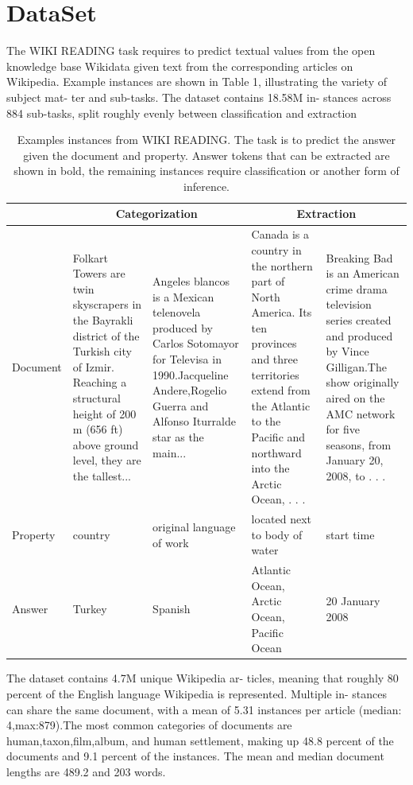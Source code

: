 \documentclass{article}
\begin{document}
\section{DataSet}
\label{data_set}

The WIKI READING task requires to predict textual values from the open knowledge base Wikidata given text from the corresponding articles on
Wikipedia. Example instances are shown
in Table 1, illustrating the variety of subject mat-
ter and sub-tasks. The dataset contains 18.58M in-
stances across 884 sub-tasks, split roughly evenly
between classification and extraction
 
\begin{table}[h!]
\begin{tabular}{ |p{2cm}|p{2cm}|p{2cm}|p{2cm}|p{2cm}|  }
 \hline
 \multicolumn{1}{|c|}{} &
 \multicolumn{2}{|c|}{Categorization} &
 \multicolumn{2}{|c|}{Extraction} \\
 \hline
 Document & Folkart Towers are twin  skyscrapers  in  the Bayrakli  district  of  the Turkish   city   of   Izmir. Reaching    a    structural height of 200 m (656 ft) above ground level, they are the tallest... &Angeles   blancos   is   a Mexican telenovela produced   by   Carlos   Sotomayor  for  Televisa  in
1990.Jacqueline  Andere,Rogelio   Guerra and   Alfonso   Iturralde star as the main... &Canada is a country in  the  northern  part  of North  America.   Its  ten
provinces and three territories  extend  from  the
Atlantic to  the Pacific and  northward  into  the
Arctic Ocean, . . .&Breaking Bad is an American  crime  drama television  series  created and  produced  by  Vince Gilligan.The show originally  aired  on  the
AMC  network  for  five seasons,  from January 20, 2008, to . . .\\
 \hline
 Property   & country    &original language of work&   located  next  to  body  of water& start time\\
 \hline
 Answer &   Turkey  & Spanish &Atlantic  Ocean,   Arctic Ocean, Pacific Ocean& 20 January 2008\\
 \hline
\end{tabular}

\caption{Examples instances from WIKI READING. The task is to predict the answer given the document and property. Answer tokens that can be extracted are shown in bold, the remaining instances require classification or another form of inference.}
\label{table:1}
\end{table}

The  dataset  contains  4.7M  unique  Wikipedia  ar-
ticles, meaning that roughly 80 percent of the English language  Wikipedia  is  represented.   Multiple  in-
stances can share the same document, with a mean
of  5.31  instances  per  article  (median: 4,max:879).The  most  common  categories  of  documents  are
human,taxon,film,album,  and human settlement, making up 48.8 percent of the documents and 9.1 percent of the instances.  The mean and median document lengths are 489.2 and 203 words.
\end{document}
